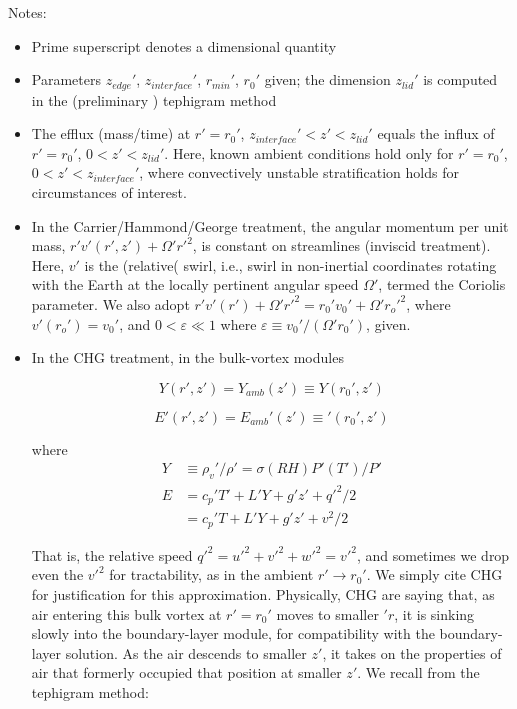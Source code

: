 \documentclass{article}
\begin{document}
Notes:
\begin{itemize}

\item Prime superscript denotes a dimensional quantity
\item Parameters $z_{edge}'$, $z_{interface}'$, $r_{min}'$, $r_0'$ given; the dimension $z_{lid}'$ is computed in the (preliminary ) tephigram method
\item The efflux (mass/time) at $r' = r_0'$, $z_{interface}' < z' < z_{lid}'$ equals the influx of $r'=r_0'$, $0 < z' < z_{lid}'$. Here, known ambient conditions hold only for $r' = r_0'$, $0 < z' < z_{interface}'$, where convectively unstable stratification holds for circumstances of interest.

\item In the Carrier/Hammond/George treatment, the angular momentum per unit mass, $r' v'(r', z') + \Omega' r'^2$, is constant on streamlines (inviscid treatment). Here, $v'$ is the (relative( swirl, i.e., swirl in non-inertial coordinates rotating with the Earth at the locally pertinent angular speed $\Omega'$, termed the Coriolis parameter. We also adopt $r' v' (r') + \Omega' r'^2 = r_0' v_0' + \Omega' r_o'^2$, where $v'(r_o') = v_0'$, and $0 < \varepsilon \ll 1$ where $\varepsilon \equiv v_0' / (\Omega' r_0')$, given.

\item In the CHG treatment, in the bulk-vortex modules

\begin{equation}
	Y(r', z') = Y_{amb}(z') \equiv Y(r_0', z')
\end{equation}

\begin{equation}
	E'(r',z') = E_{amb}'(z') \equiv'(r_0', z')
\end{equation}

where 
\begin{equation}
\begin{split}
	Y &\equiv \rho_v' / \rho' = \sigma(RH) P'(T')/ P' \\
	E &= c_p' T' + L' Y + g'z' + q'^2 /2 \\
	&= c_p' T + L'Y + g'z' + v^2 / 2
\end{split}
\end{equation}

That is, the relative speed $q'^2 = u'^2 + v'^2 + w'^2 = v'^2$, and sometimes we drop even the $v'^2$ for tractability, as in the ambient $r' \to r_0'$. We simply cite CHG for justification for this approximation. Physically, CHG are saying that, as air entering this bulk vortex at $r' = r_0'$ moves to smaller $'r$, it is sinking slowly into the boundary-layer module, for compatibility with the boundary-layer solution. As the air descends to smaller $z'$, it takes on the properties of air that formerly occupied that position at smaller $z'$. We recall from the tephigram method:


\end{itemize}
\end{document}
